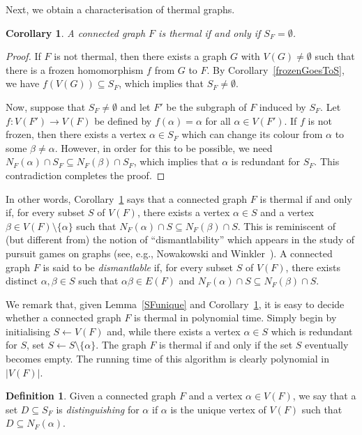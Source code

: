 \documentclass[11 pt]{amsart}
\newtheorem{cor}[equation]{Corollary}
\theoremstyle{definition}
\newtheorem{defn}[equation]{Definition}
\theoremstyle{case}
\numberwithin{equation}{section}
\begin{document}
Next, we obtain a characterisation of thermal graphs.

\begin{cor}
\label{thermalEmpty}
A connected graph $F$ is thermal if and only if $S_F=\emptyset$. 
\end{cor}

\begin{proof}
If $F$ is not thermal, then there exists a graph $G$ with $V(G)\neq\emptyset$ such that there is a frozen homomorphism $f$ from $G$ to $F$. By Corollary~\ref{frozenGoesToS}, we have $f(V(G))\subseteq S_F$, which implies that $S_F\neq\emptyset$. 

Now, suppose that $S_F\neq\emptyset$ and let $F'$ be the subgraph of $F$ induced by $S_F$. Let $f:V(F')\to V(F)$ be defined by $f(\alpha)=\alpha$ for all $\alpha\in V(F')$. If $f$ is not frozen, then there exists a vertex $\alpha\in S_F$ which can change its colour from $\alpha$ to some $\beta\neq\alpha$. However, in order for this to be possible, we need $N_F(\alpha)\cap S_F\subseteq N_F(\beta)\cap S_F$, which implies that $\alpha$ is redundant for $S_F$. This contradiction completes the proof. 
\end{proof}

In other words, Corollary~\ref{thermalEmpty} says that a connected graph $F$ is thermal if and only if, for every subset $S$ of  $V(F)$, there exists a vertex $\alpha\in S$ and a vertex $\beta \in V(F)\setminus\{\alpha\}$ such that $N_F(\alpha)\cap S\subseteq N_F(\beta)\cap S$. This is reminiscent of (but different from) the notion of  ``dismantlability'' which appears in the study of pursuit games on graphs (see, e.g., Nowakowski and Winkler~\cite{Winkler}). A connected graph $F$ is said to be \emph{dismantlable} if, for every subset $S$ of $V(F)$, there exists distinct $\alpha,\beta\in S$ such that $\alpha\beta\in E(F)$ and $N_F(\alpha)\cap S\subseteq N_F(\beta)\cap S$.  

We remark that, given Lemma~\ref{SFunique} and Corollary~\ref{thermalEmpty}, it is easy to decide whether a connected graph $F$ is thermal in polynomial time. Simply begin by initialising $S\leftarrow V(F)$ and, while there exists a vertex $\alpha\in S$ which is redundant for $S$, set $S\leftarrow S\setminus\{\alpha\}$. The graph $F$ is thermal if and only if the set $S$ eventually becomes empty. The running time of this algorithm is clearly  polynomial in $|V(F)|$.  



\begin{defn}
Given a connected graph $F$ and a vertex $\alpha\in V(F)$, we say that a set $D\subseteq S_F$ is \emph{distinguishing} for $\alpha$ if $\alpha$ is the unique vertex of $V(F)$ such that $D\subseteq N_F(\alpha)$.
\end{defn}
\end{document}
